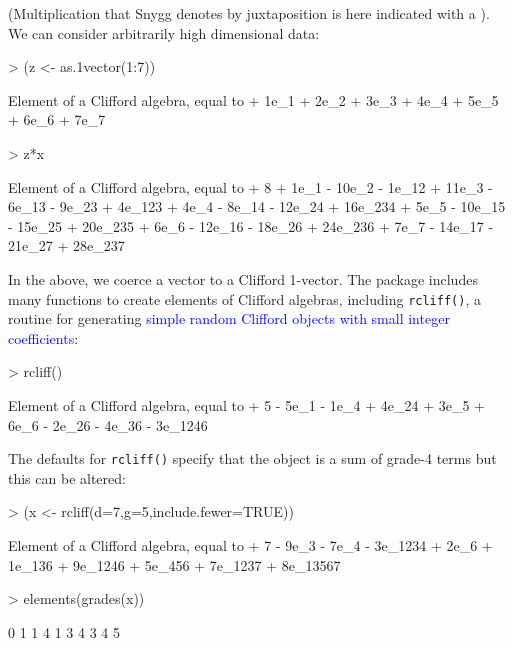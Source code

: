 \documentclass{birkjour}
\theoremstyle{definition}
\theoremstyle{remark}
\numberwithin{equation}{section}
\begin{document}
(Multiplication that Snygg denotes by juxtaposition is here indicated
with a {\tt *}).  We can consider arbitrarily high dimensional data:

\begin{Schunk}
\begin{Sinput}
> (z <- as.1vector(1:7))
\end{Sinput}
\begin{Soutput}
Element of a Clifford algebra, equal to
+ 1e_1 + 2e_2 + 3e_3 + 4e_4 + 5e_5 + 6e_6 + 7e_7
\end{Soutput}
\begin{Sinput}
> z*x
\end{Sinput}
\begin{Soutput}
Element of a Clifford algebra, equal to
+ 8 + 1e_1 - 10e_2 - 1e_12 + 11e_3 - 6e_13 - 9e_23 + 4e_123 +
4e_4 - 8e_14 - 12e_24 + 16e_234 + 5e_5 - 10e_15 - 15e_25 + 20e_235 +
6e_6 - 12e_16 - 18e_26 + 24e_236 + 7e_7 - 14e_17 - 21e_27 + 28e_237
\end{Soutput}
\end{Schunk}

In the above, we coerce a vector to a Clifford 1-vector.  The package
includes many functions to create elements of Clifford algebras,
including {\tt rcliff()}, a routine for generating
\textcolor{blue}{simple random Clifford objects with small integer
  coefficients}:

\begin{Schunk}
\begin{Sinput}
> rcliff()
\end{Sinput}
\begin{Soutput}
Element of a Clifford algebra, equal to
+ 5 - 5e_1 - 1e_4 + 4e_24 + 3e_5 + 6e_6 - 2e_26 - 4e_36 - 3e_1246
\end{Soutput}
\end{Schunk}

The defaults for {\tt rcliff()} specify that the object is a sum of
grade-4 terms but this can be altered:

\begin{Schunk}
\begin{Sinput}
> (x <- rcliff(d=7,g=5,include.fewer=TRUE))
\end{Sinput}
\begin{Soutput}
Element of a Clifford algebra, equal to
+ 7 - 9e_3 - 7e_4 - 3e_1234 + 2e_6 + 1e_136 + 9e_1246 + 5e_456
+ 7e_1237 + 8e_13567
\end{Soutput}
\begin{Sinput}
> elements(grades(x))
\end{Sinput}
\begin{Soutput}
 [1] 0 1 1 4 1 3 4 3 4 5
\end{Soutput}
\end{Schunk}
\end{document}
